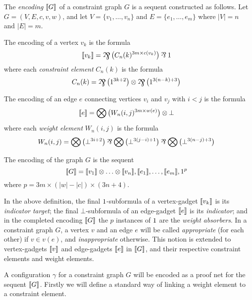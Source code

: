 \documentclass[conference]{IEEEtran}
\begin{document}
\begin{definition}
\label{def:graph encoding}
The \emph{encoding} $\llbracket G\rrbracket$ of a constraint graph $G$ is a sequent constructed as follows.
%
Let $G=(V,E,c,v,w)$, and let $V=\{v_1,\dotsc,v_n\}$ and $E=\{e_1,\dotsc,e_m\}$ where $|V|=n$ and $|E|=m$.

\noindent
The encoding of a vertex $v_k$ is the formula
\[
	\itn{v_k} = \bigparr\big(C_n(k)^{3m\times c(v_k)} \big)\parr\1
\]
where each \emph{constraint element} $C_n(k)$ is the formula
\[
	C_n(k) = \bigparr\big(1^{3k+2}\big) \tn \bigparr\big(1^{3(n-k)+3}\big)
\]

\noindent
The encoding of an edge $e$ connecting vertices $v_i$ and $v_j$ with $i<j$ is the formula
\[
	\llbracket e\rrbracket = \bigotimes\big(W_n(i,j)^{3m\times w(e)}\big)\otimes\bot
\]
where each \emph{weight element} $W_n(i,j)$ is the formula
\[
	W_n(i,j) = \bigtn\big(\bot^{3i+2}\big)\parr\bigtn\big(\bot^{3(j-i)+1}\big)\parr\bigtn\big(\bot^{3(n-j)+3}\big)
\]

\noindent
The encoding of the graph $G$ is the sequent
\[
	\llbracket G\rrbracket = \llbracket v_1\rrbracket\otimes\dotso\otimes\llbracket v_n\rrbracket, \llbracket e_1\rrbracket,\dotsc,\llbracket e_m\rrbracket, 1^p
\]
where $p=3m\times(|w|-|c|)\times(3n+4)$.

\end{definition}



In the above definition, the final $1$-subformula of a vertex-gadget $\llbracket v_k\rrbracket$ is its \emph{indicator target}; the final $\bot$-subformula of an edge-gadget $\llbracket e\rrbracket$ is its \emph{indicator}; and in the completed encoding $\llbracket G\rrbracket$ the $p$ instances of $1$ are the \emph{weight absorbers}.
%
In a constraint graph $G$, a vertex $v$ and an edge $e$ will be called \emph{appropriate} (for each other) if $v\in v(e)$, and \emph{inappropriate} otherwise.
%
This notion is extended to vertex-gadgets $\llbracket v\rrbracket$ and edge-gadgets $\llbracket e\rrbracket$ in $\llbracket G\rrbracket$, and their respective constraint elements and weight elements.



A configuration $\gamma$ for a constraint graph $G$ will be encoded as a proof net for the sequent $\llbracket G\rrbracket$.
%
Firstly we will define a standard way of linking a weight element to a constraint element.
\end{document}
